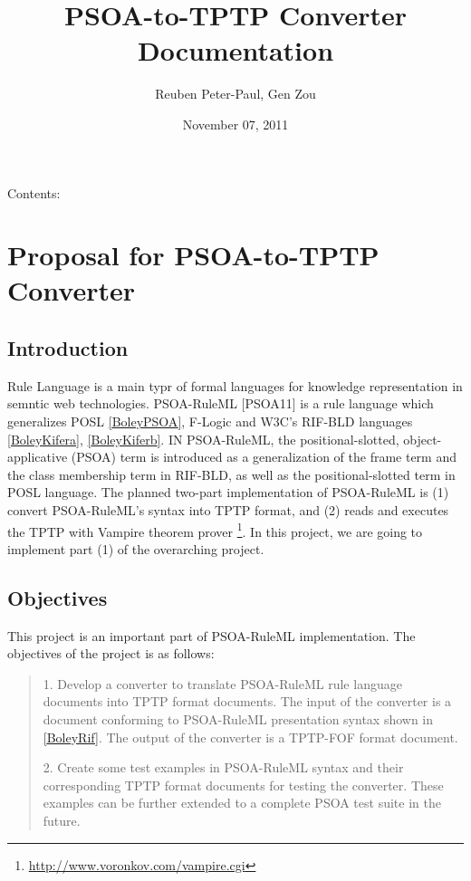 \documentclass[letterpaper,10pt,english]{sphinxmanual}
\title{PSOA-to-TPTP Converter Documentation}
\date{November 07, 2011}
\author{Reuben Peter-Paul, Gen Zou}
\begin{document}
\maketitle
\tableofcontents
{}\label{main::doc}


Contents:


\chapter{Proposal for PSOA-to-TPTP Converter}
\label{project-proposal/index::doc}\label{project-proposal/index:welcome-to-psoa-to-tptp-converter-s-documentation}\label{project-proposal/index:proposal-for-psoa-to-tptp-converter}

\section{Introduction}
\label{project-proposal/index:introduction}
Rule Language is a main typr of formal languages for knowledge representation in
semntic web technologies.  PSOA-RuleML {[}PSOA11{]} is a rule language which
generalizes POSL {\hyperref[project-proposal/index:boleypsoa]{{[}BoleyPSOA{]}}}, F-Logic and W3C's RIF-BLD languages
{\hyperref[project-proposal/index:boleykifera]{{[}BoleyKifera{]}}}, {\hyperref[project-proposal/index:boleykiferb]{{[}BoleyKiferb{]}}}.  IN PSOA-RuleML, the positional-slotted,
object-applicative (PSOA) term is introduced as a generalization of the frame
term and the class membership term in RIF-BLD, as well as the positional-slotted
term in POSL language.  The planned two-part implementation of PSOA-RuleML is
(1) convert PSOA-RuleML's syntax into TPTP format, and (2) reads and executes
the TPTP with Vampire theorem prover \footnote{
\href{http://www.voronkov.com/vampire.cgi}{http://www.voronkov.com/vampire.cgi}
}.  In this project, we are going to
implement part (1) of the overarching project.


\section{Objectives}
\label{project-proposal/index:objectives}
This project is an important part of PSOA-RuleML implementation.  The objectives
of the project is as follows:
\begin{quote}

1. Develop a converter to translate PSOA-RuleML rule language documents into TPTP
format documents.  The input of the converter is a document conforming to
PSOA-RuleML presentation syntax shown in {\hyperref[project-proposal/index:boleyrif]{{[}BoleyRif{]}}}.  The output of the
converter is a TPTP-FOF format document.

2. Create some test examples in PSOA-RuleML syntax and their corresponding TPTP
format documents for testing the converter.  These examples can be further
extended to a complete PSOA test suite in the future.
\end{quote}
\end{document}
